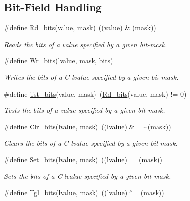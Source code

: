 \subsection*{Bit-\/\+Field Handling}
\begin{DoxyCompactItemize}
\item 
\#define \hyperlink{group__group__sam0__utils_ga53d9294b7065346ffa04d7991d2bc31e}{Rd\+\_\+bits}(value,  mask)~((value) \& (mask))
\begin{DoxyCompactList}\small\item\em Reads the bits of a value specified by a given bit-\/mask. \end{DoxyCompactList}\item 
\#define \hyperlink{group__group__sam0__utils_ga97b2bc0b5cdc7ec5293b7a5304cee0f0}{Wr\+\_\+bits}(lvalue,  mask,  bits)
\begin{DoxyCompactList}\small\item\em Writes the bits of a C lvalue specified by a given bit-\/mask. \end{DoxyCompactList}\item 
\#define \hyperlink{group__group__sam0__utils_gab1e92741077b101e6b2df74880e71e96}{Tst\+\_\+bits}(value,  mask)~(\hyperlink{group__group__sam0__utils_ga53d9294b7065346ffa04d7991d2bc31e}{Rd\+\_\+bits}(value, mask) != 0)
\begin{DoxyCompactList}\small\item\em Tests the bits of a value specified by a given bit-\/mask. \end{DoxyCompactList}\item 
\#define \hyperlink{group__group__sam0__utils_gaffbccbb234075f838e181522c864605f}{Clr\+\_\+bits}(lvalue,  mask)~((lvalue) \&= $\sim$(mask))
\begin{DoxyCompactList}\small\item\em Clears the bits of a C lvalue specified by a given bit-\/mask. \end{DoxyCompactList}\item 
\#define \hyperlink{group__group__sam0__utils_ga589436fa123e32e1063488ebd7fdc923}{Set\+\_\+bits}(lvalue,  mask)~((lvalue) $\vert$=  (mask))
\begin{DoxyCompactList}\small\item\em Sets the bits of a C lvalue specified by a given bit-\/mask. \end{DoxyCompactList}\item 
\#define \hyperlink{group__group__sam0__utils_ga9f29d1e990286322697ae8d0f4e365e0}{Tgl\+\_\+bits}(lvalue,  mask)~((lvalue) $^\wedge$=  (mask))

\end{DoxyCompactItemize}
